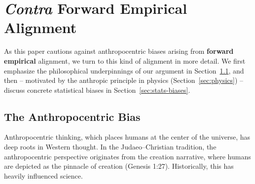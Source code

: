 \documentclass{article}
\theoremstyle{plain}
\theoremstyle{definition}
\theoremstyle{remark}
\begin{document}


\section{\textit{Contra} Forward Empirical Alignment}\label{sec:forward-emp}

As this paper cautions against anthropocentric biases arising from \textbf{forward empirical} alignment, we turn to this kind of alignment in more detail. We first emphasize the philosophical underpinnings of our argument in Section~\ref{sec:anthro-bias}, and then -- motivated by the anthropic principle in physics (Section~\ref{sec:physics}) -- discuss concrete statistical biases in Section~\ref{sec:stats-biases}. 

\subsection{The Anthropocentric Bias}\label{sec:anthro-bias}


Anthropocentric thinking, which places humans at the center of the universe, has deep roots in Western thought. In the Judaeo–Christian tradition, the anthropocentric perspective originates from the creation narrative, where humans are depicted as the pinnacle of creation (Genesis 1:27). Historically, this has heavily influenced science. %
\end{document}

